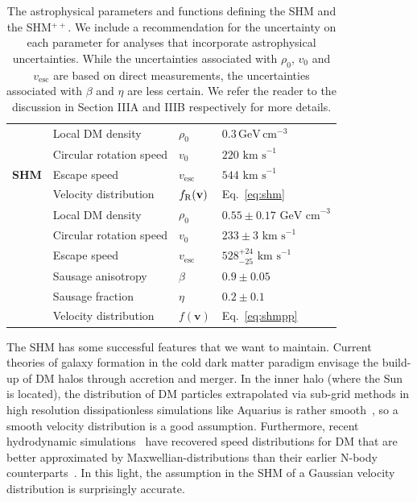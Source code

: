 \documentclass[prd,10pt,twocolumn,showpacs,nofootinbib, aps,superscriptaddress,preprintnumbers]{revtex4-1}
\newcommand{\vesc}{v_\mathrm{esc}}
\newcommand{\GeVcm}{\textrm{ GeV cm}^{-3}}
\newcommand{\kms}{\textrm{ km s}^{-1}}
\newcommand{\ra}[1]{\renewcommand{\arraystretch}{#1}}
\newcommand{\fR}{f_{\rm R}}
\begin{document}
\begin{table}[t!]
\ra{1.3}
\begin{tabular}{@{}llll@{}}
\hline\hline
\multirow{5}{*}{\bf SHM} & Local DM density &$\rho_0$ 		& $0.3 \, \mathrm{GeV} \, \mathrm{cm}^{-3}$\\
			& Circular rotation speed &$v_0$ 	& $220 \kms$\\
			& Escape speed &$\vesc$ & $544 \kms$\\
			& Velocity distribution & $\fR(\mathbf{v})$ & Eq.~\eqref{eq:shm} \\
\hline
\multirow{6}{*}{{\bf SHM}$^{++}$} & Local DM density &$\rho_0$ & $0.55\pm 0.17\GeVcm$\\
			& Circular rotation speed & $v_0$ 	& $233\pm 3 \kms$\\
			& Escape speed &$\vesc$ & $528^{+24}_{-25} \kms$\\
			& Sausage anisotropy & $\beta$ & $0.9\pm 0.05$ \\
				& Sausage fraction &$\eta$ & $0.2 \pm 0.1$\\
				& Velocity distribution & $f(\mathbf{v})$ & Eq.~\eqref{eq:shmpp} \\
\hline\hline
\end{tabular}
\caption{The astrophysical parameters and functions defining the SHM
  and the SHM$^{++}$. We include a recommendation for the uncertainty
  on each parameter for analyses that incorporate astrophysical
  uncertainties. While the uncertainties associated with $\rho_0$,
  $v_0$ and $\vesc$ are based on direct measurements, the
  uncertainties associated with $\beta$ and $\eta$ are less
  certain. We refer the reader to the discussion in Section IIIA and
  IIIB respectively for more details.
}
\label{tab:astrobenchmarks}
\end{table}

The SHM has some successful features that we want to maintain.
Current theories of galaxy formation in the cold dark
matter paradigm envisage the build-up of DM halos through
accretion and merger. 
In the inner halo (where the Sun is located), the distribution of DM
particles extrapolated via sub-grid methods in high resolution
dissipationless simulations like Aquarius is rather
smooth~\citep{Vo11}, so a smooth velocity distribution
is a good assumption.
Furthermore, recent
hydrodynamic simulations~\cite{Bozorgnia:2016ogo,Kelso:2016qqj,Sloane:2016kyi,Lentz:2017aay} have recovered speed distributions for DM
that are better approximated by Maxwellian-distributions than their earlier N-body
counterparts~\cite{Hansen:2005yj,Vogelsberger:2008qb,Kuhlen:2009vh,Ling:2009eh,Mao:2012hf,Mao:2013nda}. 
In this light, the assumption in the SHM of a Gaussian velocity distribution
 is surprisingly accurate.
\end{document}
